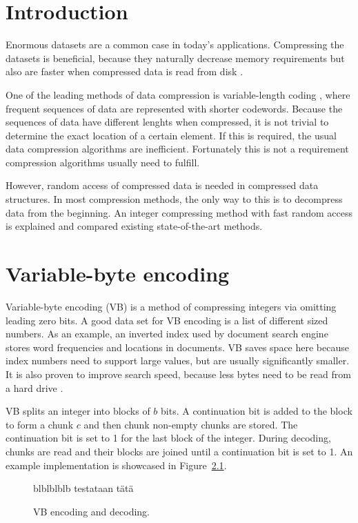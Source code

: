 \chapter{Introduction}
Enormous datasets are a common case in today's applications. Compressing the datasets is beneficial, because they 
naturally decrease memory requirements but also are faster when compressed data is read from disk \citep{Zob95}.

One of the leading methods of data compression is variable-length coding \citep{Sal99}, where frequent sequences of data
are represented with shorter codewords. Because the sequences of data have different lenghts when compressed, it is 
not trivial to determine the exact location of a certain element. If this is required, the usual data compression algorithms are
inefficient. Fortunately this is not a requirement compression algorithms usually need to fulfill. 

However, random access of compressed data is needed in compressed data structures. In most compression methods, the only way 
to this is to decompress data from the beginning. An integer compressing method with fast random access is explained and compared
existing state-of-the-art methods.

\chapter{Variable-byte encoding}

Variable-byte encoding \citep{Wil99} (VB) is a method of compressing integers via omitting leading zero bits. A good data set for 
VB encoding is a list of different sized numbers. As an example, an inverted index used by document search engine stores word frequencies and 
locations in documents. VB saves space here because index numbers need to support large values, but are usually significantly smaller. 
It is also proven to improve search speed, because less bytes need to be read from a hard drive \citep{Sch02}.

VB splits an integer into blocks of $b$ bits. A continuation bit is added to the block to form a chunk $c$ and then chunk non-empty chunks are stored.
The continuation bit is set to 1 for the last block of the integer. During decoding, chunks are read and their blocks are joined until a continuation 
bit is set to 1. An example implementation is showcased in Figure~\ref{fig:vbyte}.

\begin{figure}[h!] 
\centering 
blblblblb
testataan
tätä
\caption{VB encoding and decoding.\label{fig:vbyte}}
\end{figure}

